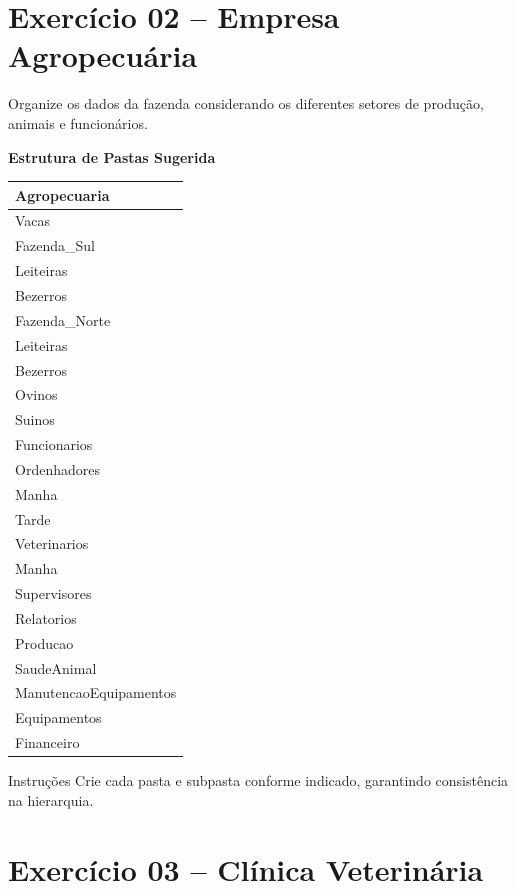 \documentclass[12pt]{article}
\begin{document}
\section*{Exercício 02 – Empresa Agropecuária}

Organize os dados da fazenda considerando os diferentes setores de produção, animais e funcionários.

\begin{table}[H]
\centering
\small
\textbf{Estrutura de Pastas Sugerida}\\
\begin{tabular}{l}
\hline
\rowcolor{tableheader} \textbf{Agropecuaria} \\ \hline
\quad Vacas \\
\quad\quad Fazenda\_Sul \\
\quad\quad\quad Leiteiras \\
\quad\quad\quad Bezerros \\
\quad\quad Fazenda\_Norte \\
\quad\quad\quad Leiteiras \\
\quad\quad\quad Bezerros \\
\quad Ovinos \\
\quad Suinos \\
\quad Funcionarios \\
\quad\quad Ordenhadores \\
\quad\quad\quad Manha \\
\quad\quad\quad Tarde \\
\quad\quad Veterinarios \\
\quad\quad\quad Manha \\
\quad\quad Supervisores \\
\quad Relatorios \\
\quad\quad Producao \\
\quad\quad SaudeAnimal \\
\quad\quad ManutencaoEquipamentos \\
\quad Equipamentos \\
\quad Financeiro \\
\hline
\end{tabular}
\end{table}

\begin{block}{Instruções}
Crie cada pasta e subpasta conforme indicado, garantindo consistência na hierarquia.
\end{block}
\vspace*{5cm}

\section*{Exercício 03 – Clínica Veterinária}
\end{document}
